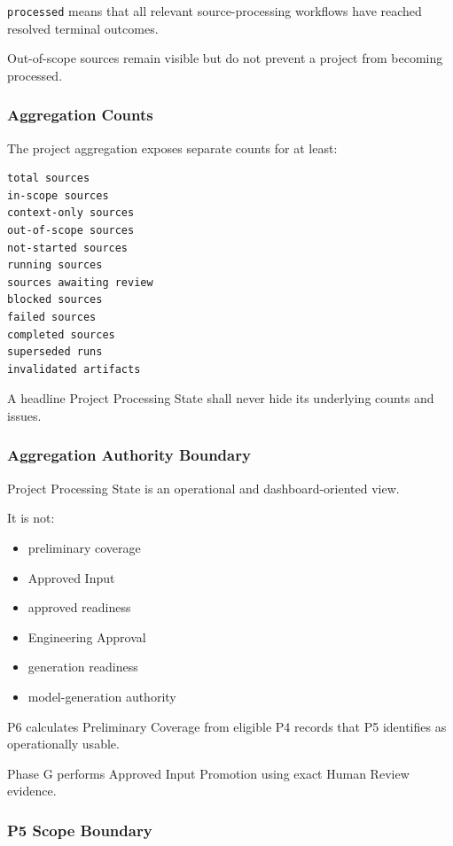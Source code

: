 \texttt{processed} means that all relevant source-processing workflows have reached resolved terminal outcomes.

Out-of-scope sources remain visible but do not prevent a project from becoming processed.

\hypertarget{aggregation-counts}{%
\subsubsection{Aggregation Counts}\label{aggregation-counts}}

The project aggregation exposes separate counts for at least:

\begin{verbatim}
total sources
in-scope sources
context-only sources
out-of-scope sources
not-started sources
running sources
sources awaiting review
blocked sources
failed sources
completed sources
superseded runs
invalidated artifacts
\end{verbatim}

A headline Project Processing State shall never hide its underlying counts and issues.

\hypertarget{aggregation-authority-boundary}{%
\subsubsection{Aggregation Authority Boundary}\label{aggregation-authority-boundary}}

Project Processing State is an operational and dashboard-oriented view.

It is not:

\begin{itemize}
\tightlist
\item
  preliminary coverage
\item
  Approved Input
\item
  approved readiness
\item
  Engineering Approval
\item
  generation readiness
\item
  model-generation authority
\end{itemize}

P6 calculates Preliminary Coverage from eligible P4 records that P5 identifies as operationally usable.

Phase G performs Approved Input Promotion using exact Human Review evidence.

\hypertarget{p5-scope-boundary}{%
\subsubsection{P5 Scope Boundary}\label{p5-scope-boundary}}

